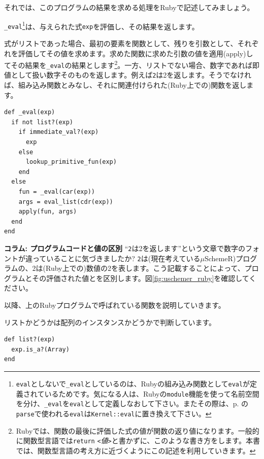 \setcounter{footnote}{3}

それでは、このプログラムの結果を求める処理をRubyで記述してみましょう。

{\tt \_eval}\footnote{{\tt eval}としないで{\tt \_eval}としているのは、Rubyの組み込み関数として{\tt eval}が定義されているためです。気になる人は、Rubyの{\tt module}機能を使って名前空間を分け、{\tt \_eval}を{\tt eval}として定義しなおして下さい。またその際は、p. \pageref{fun:parse}の{\tt parse}で使われる{\tt eval}は{\tt Kernel::eval}に置き換えて下さい。}は、与えられた式{\tt exp}を評価し、その結果を返します。

式がリストであった場合、最初の要素を関数として、残りを引数として、それぞれを評価してその値を求めます。求めた関数に求めた引数の値を適用(apply)してその結果を{\tt \_eval}の結果とします\footnote{Rubyでは、関数の最後に評価した式の値が関数の返り値になります。一般的に関数型言語では{\tt return} {\it {\tt <}値{\tt >}}と書かずに、このような書き方をします。本書では、関数型言語の考え方に近づくようにこの記述を利用していきます。}。一方、リストでない場合、数字であれば即値として扱い数字そのものを返します。例えば{\tt 2}は2を返します。そうでなければ、組み込み関数とみなし、それに関連付けられた(Ruby上での)関数を返します。

\begin{lstlisting}
def _eval(exp)
  if not list?(exp) 
    if immediate_val?(exp)
      exp
    else 
      lookup_primitive_fun(exp)
    end
  else
    fun = _eval(car(exp))
    args = eval_list(cdr(exp))
    apply(fun, args)
  end
end
\end{lstlisting}

\begin{breakitembox}[l]{\bf コラム: プログラムコードと値の区別} 
“{\tt 2}は2を返します”という文章で数字のフォントが違っていることに気づきましたか? {\tt 2}は(現在考えている$\mu$SchemeR)プログラムの、2は(Ruby上での)数値の2を表します。こう記載することによって、プログラムとその評価された値とを区別します。図\ref{fig:uschemer_ruby}を確認してください。
\end{breakitembox}

以降、上のRubyプログラムで呼ばれている関数を説明していきます。

リストかどうかは配列のインスタンスかどうかで判断しています。

\begin{lstlisting}
def list?(exp)
  exp.is_a?(Array)
end
\end{lstlisting}

